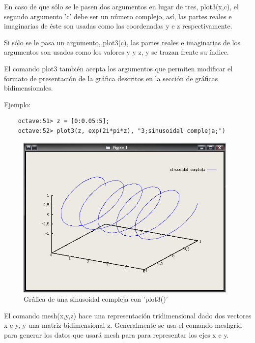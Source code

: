 \documentclass[a4,12pt]{article}
\begin{document}
En caso de que sólo se le pasen dos argumentos en lugar de tres, plot3(x,c), el segundo argumento 'c' debe ser un número complejo, así, las partes reales e imaginarias de éste son usadas como las coordenadas y e z respectivamente.

Si sólo se le pasa un argumento, plot3(c), las partes reales e imaginarias de los argumentos son usados como los valores y y z, y se trazan frente su índice.

El comando plot3 también acepta los argumentos que permiten modificar el formato de presentación de la gráfica descritos en la sección de gráficas bidimensionales.

Ejemplo:\\
\begin{verbatim}
	octave:51> z = [0:0.05:5];
    octave:52> plot3(z, exp(2i*pi*z), "3;sinusoidal compleja;")
\end{verbatim}
\begin{figure}[H]
  \centering
    \includegraphics{graficos/imagen4}
  \caption{Gráfica de una sinusoidal compleja con 'plot3()'}
\end{figure}

El comando mesh(x,y,z) hace una representación tridimensional dado dos vectores x e y,  y  una  matriz  bidimensional  z.  Generalmente  se  usa  el  comando  meshgrid para generar los datos que usará mesh para para representar los ejes x e y.
\end{document}
